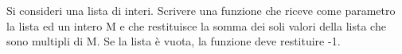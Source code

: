 \begin{Exercise}[label={ex:somma_multipli}]
    Si consideri una lista di interi. Scrivere una funzione che riceve come parametro la lista ed un intero M
    e che restituisce la somma dei soli valori della lista che sono multipli di M. Se la lista è vuota, la funzione
    deve restituire -1.
\end{Exercise}

\begin{Answer}[ref={ex:somma_multipli}]
  	
\end{Answer}